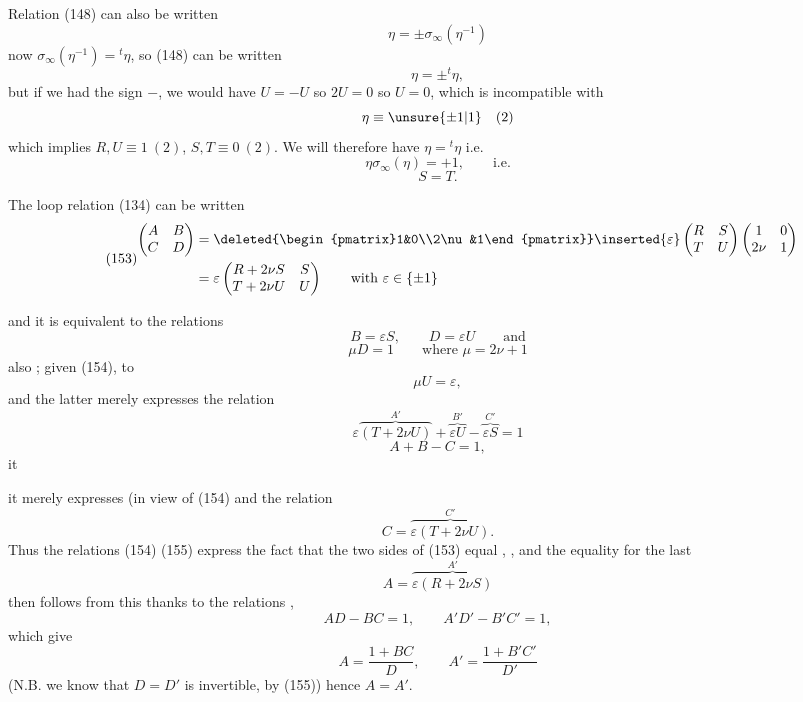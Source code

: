 Relation (148) can also be written
\[
\eta=\pm\sigma_\infty(\eta^{-1})
\]
now $\sigma_\infty(\eta^{-1})={}^t\eta$, so (148) can be written
\[
\eta=\pm{}^t\eta,
\]
but if we had the sign $-$, we would have $U=-U$ so $2U=0$ so $U=0$, which is incompatible with
\[
\eta\equiv\unsure{\pm1|1}\quad(2)
\]
which implies $R,U\equiv1\ (2)$, $S,T\equiv0\ (2)$. We will therefore have $\eta={}^t\eta$ i.e.
\[
\tag{151}
\eta\sigma_\infty(\eta)=+1,\qquad\text{i.e.}
\]
\[
\tag{152}
S=T.
\]

The loop relation (134) can be written
\[
\tag{153}
\begin{aligned}
\begin{pmatrix}A&B\\C&D\end{pmatrix}
&=\deleted{\begin{pmatrix}1&0\\2\nu&1\end{pmatrix}}
\inserted{\varepsilon}\begin{pmatrix}R&S\\T&U\end{pmatrix}
\begin{pmatrix}1&0\\2\nu&1\end{pmatrix}\\
&=\varepsilon\begin{pmatrix}R+2\nu S&S\\T+2\nu U&U\end{pmatrix}
\qquad\text{with }\varepsilon\in\{\pm1\}
\end{aligned}
\]


and it is equivalent to the relations
\[
\tag{154}
B=\varepsilon S,\qquad D=\varepsilon U\qquad\text{and}
\]
\[
\tag{155}
\mu D=1\qquad\text{where }\mu=2\nu+1
\]
 also ; given (154), to
\[
\tag{155bis}
\mu U=\varepsilon,
\]
and the latter merely expresses  the relation
\[
\varepsilon\overbrace{(T+2\nu U)}^{A'}
+\overbrace{\varepsilon U}^{B'}-\overbrace{\varepsilon S}^{C'}=1
\]
\[
A+B-C=1,
\]
it


it merely expresses (in view of (154) and  the relation
\[
C=\overbrace{\varepsilon(T+2\nu U)}^{C'}.
\]
Thus the relations (154) (155) express the fact that the two sides of (153)   equal  , , and the equality for the last
\[
A=\overbrace{\varepsilon(R+2\nu S)}^{A'}
\]
then follows from this thanks to the relations , 
\[
AD-BC=1,\qquad A'D'-B'C'=1,
\]
which give
\[
A=\frac{1+BC}{D},\qquad A'=\frac{1+B'C'}{D'}
\]
(N.B. we know that $D=D'$ is invertible, by (155)) hence $A=A'$.

